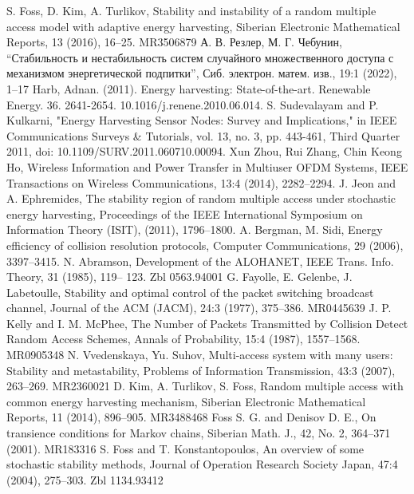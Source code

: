 \documentclass[10pt, reqno]{amsart}
\begin{document}
\begin{thebibliography}{1}
\bigskip
\footnotesize
{}
S. Foss, D. Kim, A. Turlikov, Stability and instability of a random multiple access model with adaptive energy harvesting, Siberian
Electronic Mathematical Reports, 13 (2016), 16–25. MR3506879
А. В. Резлер, М. Г. Чебунин, “Стабильность и нестабильность систем случайного множественного доступа с механизмом энергетической подпитки”, Сиб. электрон. матем. изв., 19:1 (2022), 1–17
Harb, Adnan. (2011). Energy harvesting: State-of-the-art. Renewable Energy. 36. 2641-2654. 10.1016/j.renene.2010.06.014. 
S. Sudevalayam and P. Kulkarni, "Energy Harvesting Sensor Nodes: Survey and Implications," in IEEE Communications Surveys & Tutorials, vol. 13, no. 3, pp. 443-461, Third Quarter 2011, doi: 10.1109/SURV.2011.060710.00094.
Xun Zhou, Rui Zhang, Chin Keong Ho, Wireless Information and Power Transfer in Multiuser OFDM Systems, IEEE Transactions on Wireless Communications, 13:4 (2014), 2282–2294.
J. Jeon and A. Ephremides, The stability region of random multiple access under stochastic energy harvesting, Proceedings of the IEEE International Symposium on Information Theory (ISIT), (2011), 1796–1800.
A. Bergman, M. Sidi, Energy efficiency of collision resolution protocols, Computer Communications, 29 (2006), 3397–3415.
N. Abramson, Development of the ALOHANET, IEEE Trans. Info. Theory, 31 (1985), 119– 123. Zbl 0563.94001
G. Fayolle, E. Gelenbe, J. Labetoulle, Stability and optimal control of the packet switching broadcast channel, Journal of the ACM (JACM), 24:3 (1977), 375–386. MR0445639
J. P. Kelly and I. M. McPhee, The Number of Packets Transmitted by Collision Detect Random Access Schemes, Annals of Probability, 15:4 (1987), 1557–1568. MR0905348
N. Vvedenskaya, Yu. Suhov, Multi-access system with many users: Stability and metastability, Problems of Information Transmission, 43:3 (2007), 263–269. MR2360021
D. Kim, A. Turlikov, S. Foss, Random multiple access with common energy harvesting mechanism, Siberian
Electronic Mathematical Reports, 11 (2014), 896–905. MR3488468
Foss S. G. and Denisov D. E., On transience conditions for Markov chains, Siberian Math. J., 42, No. 2, 364–371 
(2001). MR183316
S. Foss and T. Konstantopoulos, An overview of some stochastic stability methods, Journal of Operation Research Society Japan, 47:4 (2004), 275–303. Zbl 1134.93412

\end{thebibliography}
\end{document}
